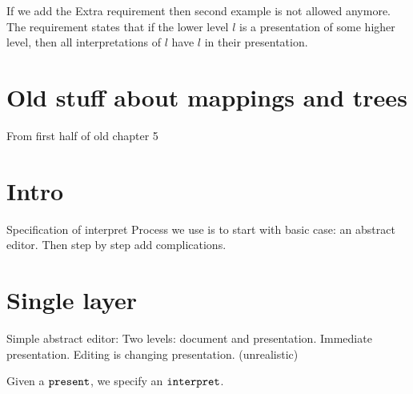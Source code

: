 
If we add the {\sc Extra} requirement then second example is not allowed anymore. The requirement states that if the lower level $l$ is a presentation of some higher level, then all interpretations of $l$ have $l$ in their presentation.

%																
%																
%																
\section{Old stuff about mappings and trees}

\bl
\* From first half of old chapter 5
\el



%																
%																
%																
\section{Intro}


\bl
\* Specification of interpret
\* Process we use is to start with basic case: an abstract editor. 
\* Then step by step add complications.
\el



%																
%																
%																
\section{Single layer}

\bl
\* Simple abstract editor: Two levels: document and presentation.
\* Immediate presentation.
\* Editing is changing presentation. (unrealistic)
\el


Given a ${\tt present}$, we specify an ${\tt interpret}$.



